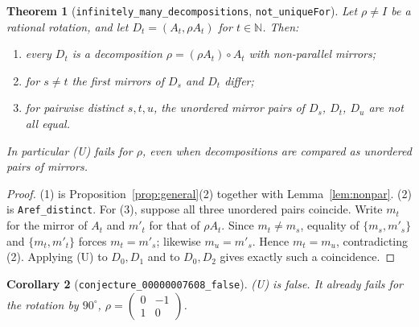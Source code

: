 \documentclass[11pt]{article}
\newtheorem{theorem}{Theorem}
\newtheorem{corollary}[theorem]{Corollary}
\theoremstyle{definition}
\theoremstyle{remark}
\newcommand{\N}{\mathbb N}
\begin{document}
\begin{theorem}[\texttt{infinitely\_many\_decompositions}, \texttt{not\_uniqueFor}]
\label{thm:rational}
Let $\rho\neq I$ be a rational rotation, and let $D_t=(A_t,\rho A_t)$ for $t\in\N$. Then:
\begin{enumerate}
\item every $D_t$ is a decomposition $\rho=(\rho A_t)\circ A_t$ with non-parallel mirrors;
\item for $s\neq t$ the first mirrors of $D_s$ and $D_t$ differ;
\item for pairwise distinct $s,t,u$, the unordered mirror pairs of $D_s$, $D_t$, $D_u$ are not
all equal.
\end{enumerate}
In particular (U) fails for $\rho$, even when decompositions are compared as unordered pairs of
mirrors.
\end{theorem}
\begin{proof}
(1) is Proposition~\ref{prop:general}(2) together with Lemma~\ref{lem:nonpar}. (2) is
\texttt{Aref\_distinct}. For (3), suppose all three unordered pairs coincide. Write $m_t$ for the
mirror of $A_t$ and $m'_t$ for that of $\rho A_t$. Since $m_t\neq m_s$, equality of
$\{m_s,m'_s\}$ and $\{m_t,m'_t\}$ forces $m_t=m'_s$; likewise $m_u=m'_s$. Hence $m_t=m_u$,
contradicting (2). Applying (U) to $D_0,D_1$ and to $D_0,D_2$ gives exactly such a coincidence.
\end{proof}

\begin{corollary}[\texttt{conjecture\_00000007608\_false}]
(U) is false. It already fails for the rotation by $90^\circ$, $\rho=\left(\begin{smallmatrix}0&-1\\
1&0\end{smallmatrix}\right)$.
\end{corollary}
\end{document}
